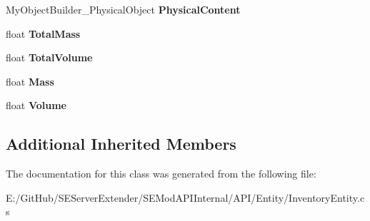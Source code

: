 \begin{DoxyCompactItemize}
\item 
\hypertarget{class_s_e_mod_a_p_i_internal_1_1_a_p_i_1_1_entity_1_1_inventory_item_entity_a408d8df6c73e41053c37980ff7e8aa35}{}My\+Object\+Builder\+\_\+\+Physical\+Object {\bfseries Physical\+Content}\label{class_s_e_mod_a_p_i_internal_1_1_a_p_i_1_1_entity_1_1_inventory_item_entity_a408d8df6c73e41053c37980ff7e8aa35}

\item 
\hypertarget{class_s_e_mod_a_p_i_internal_1_1_a_p_i_1_1_entity_1_1_inventory_item_entity_ab63b01520b266c5dc88780ef70a6ea7a}{}float {\bfseries Total\+Mass}\label{class_s_e_mod_a_p_i_internal_1_1_a_p_i_1_1_entity_1_1_inventory_item_entity_ab63b01520b266c5dc88780ef70a6ea7a}

\item 
\hypertarget{class_s_e_mod_a_p_i_internal_1_1_a_p_i_1_1_entity_1_1_inventory_item_entity_ad3a79310422ea0b7a9ea0a0a4b2f0a43}{}float {\bfseries Total\+Volume}\label{class_s_e_mod_a_p_i_internal_1_1_a_p_i_1_1_entity_1_1_inventory_item_entity_ad3a79310422ea0b7a9ea0a0a4b2f0a43}

\item 
\hypertarget{class_s_e_mod_a_p_i_internal_1_1_a_p_i_1_1_entity_1_1_inventory_item_entity_a1e7020472e77152453d85f003812a650}{}float {\bfseries Mass}\label{class_s_e_mod_a_p_i_internal_1_1_a_p_i_1_1_entity_1_1_inventory_item_entity_a1e7020472e77152453d85f003812a650}

\item 
\hypertarget{class_s_e_mod_a_p_i_internal_1_1_a_p_i_1_1_entity_1_1_inventory_item_entity_a2a08fd485919ce22c41a38d54c3f7358}{}float {\bfseries Volume}\label{class_s_e_mod_a_p_i_internal_1_1_a_p_i_1_1_entity_1_1_inventory_item_entity_a2a08fd485919ce22c41a38d54c3f7358}

\end{DoxyCompactItemize}
\subsection*{Additional Inherited Members}


The documentation for this class was generated from the following file\+:\begin{DoxyCompactItemize}
\item 
E\+:/\+Git\+Hub/\+S\+E\+Server\+Extender/\+S\+E\+Mod\+A\+P\+I\+Internal/\+A\+P\+I/\+Entity/Inventory\+Entity.\+cs\end{DoxyCompactItemize}

